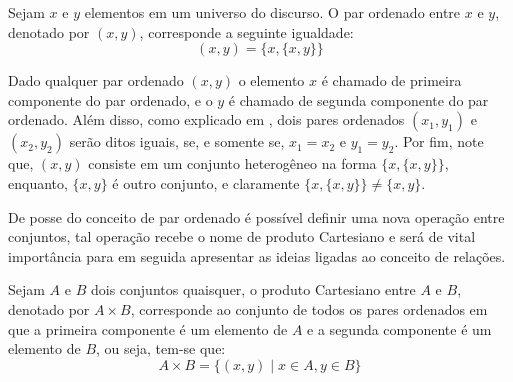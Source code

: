 \begin{definicao}\label{def:ParOrdenado}
    Sejam $x$ e $y$ elementos em um universo do discurso. O par ordenado entre $x$ e $y$, denotado por $(x, y)$, corresponde a seguinte igualdade:
    \begin{equation*}
        (x, y) = \{x, \{x, y\}\}
    \end{equation*}
\end{definicao}


Dado qualquer par ordenado $(x, y)$ o elemento $x$ é chamado de primeira componente do par ordenado, e o $y$ é chamado de segunda componente do par ordenado. Além disso, como explicado em \cite{lipschutz1978-TC, lipschutz2013-MD}, dois pares ordenados $(x_1, y_1)$ e $(x_2, y_2)$ serão ditos iguais, se, e somente se, $x_1 = x_2$ e $y_1 = y_2$. Por fim, note que, $(x, y)$ consiste em um conjunto heterogêneo na forma $\{x, \{x, y\}\}$, enquanto, $\{x, y\}$ é outro conjunto, e claramente $\{x, \{x, y\}\} \neq \{x, y\}$.

De posse do conceito de par ordenado é possível definir uma nova operação entre conjuntos, tal operação recebe o nome de produto Cartesiano e será de vital importância para em seguida apresentar as ideias ligadas ao conceito de relações.

\begin{definicao}\label{def:ProdutoCartesiano}
    Sejam $A$ e $B$ dois conjuntos quaisquer, o produto Cartesiano entre $A$ e $B$, denotado por $A \times B$, corresponde ao conjunto de todos os pares ordenados em que a primeira componente é um elemento de $A$ e a segunda componente é um elemento de $B$, ou seja, tem-se que:
    \begin{equation*}
        A \times B = \{(x, y) \mid x \in A, y \in B\}
    \end{equation*}
\end{definicao}

